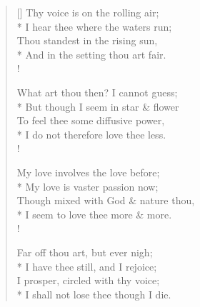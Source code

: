 \documentclass[MAIN]{subfiles}
\begin{document}
\settowidth{\versewidth}{Thy voice is on the rolling air;}
\begin{verse}[\versewidth]
Thy voice is on the rolling air;\\*
\vin I hear thee where the waters run;\\
\vin Thou standest in the rising sun,\\*
And in the setting thou art fair.\\!

What art thou then? I cannot guess;\\*
\vin But though I seem in star \& flower\\
\vin To feel thee some diffusive power,\\*
I do not therefore love thee less.\\!

My love involves the love before;\\*
\vin My love is vaster passion now;\\
\vin Though mixed with God \& nature thou,\\*
I seem to love thee more \& more.\\!

Far off thou art, but ever nigh;\\*
\vin I have thee still, and I rejoice;\\
\vin I prosper, circled with thy voice;\\*
I shall not lose thee though I die.
\end{verse}
\end{document}
